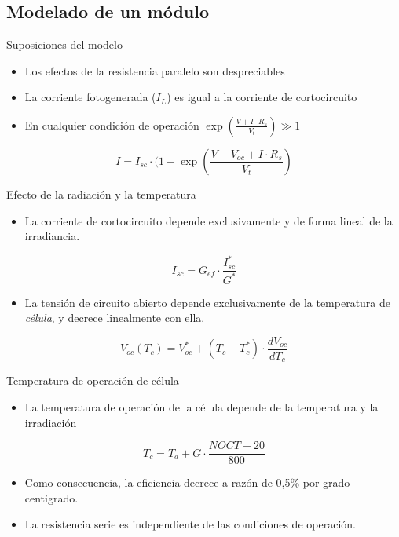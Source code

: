\documentclass[xcolor={usenames,svgnames,dvipsnames}]{beamer}
\begin{document}
\subsection{Modelado de un módulo}
\label{sec:org0626169}

\begin{frame}[label={sec:org63cbd6f}]{Suposiciones del modelo}
\begin{itemize}[<+->]
\item Los efectos de la resistencia paralelo son despreciables

\item La corriente fotogenerada (\(I_{L}\)) es igual a la corriente de cortocircuito

\item En cualquier condición de operación \(\exp(\frac{V+I\cdot R_{s}}{V_{t}})\gg1\)
\end{itemize}

\[
I=I_{sc}\cdot(1-\exp(\frac{V-V_{oc}+I\cdot R_{s}}{V_{t}})
\]
\end{frame}

\begin{frame}[label={sec:org1f141f1}]{Efecto de la radiación y la temperatura}
\begin{itemize}[<+->]
\item La \alert{corriente de cortocircuito} depende exclusivamente y de forma lineal de la \alert{irradiancia}.
\end{itemize}
\[
I_{sc}=G_{ef}\cdot\frac{I_{sc}^{*}}{G^{*}}
\]

\begin{itemize}
\item La \alert{tensión de circuito abierto} depende exclusivamente de la \alert{temperatura de \emph{célula}}, y decrece linealmente con ella.
\end{itemize}
\[
V_{oc}(T_{c})=V_{oc}^{*}+(T_{c}-T_{c}^{*})\cdot\frac{dV_{oc}}{dT_{c}}
\]
\end{frame}

\begin{frame}[label={sec:org4c2b8ec}]{Temperatura de operación de célula}
\begin{itemize}
\item La \alert{temperatura de operación de la célula} depende de la \alert{temperatura y la irradiación}
\end{itemize}
$$T_{c}=T_{a}+G\cdot\frac{NOCT-20}{800}$$

\begin{itemize}
\item Como consecuencia, la \alert{eficiencia decrece} a razón de 0,5\% por grado centigrado.

\item La \alert{resistencia serie} es \alert{independiente} de las condiciones de operación.
\end{itemize}
\end{frame}
\end{document}
